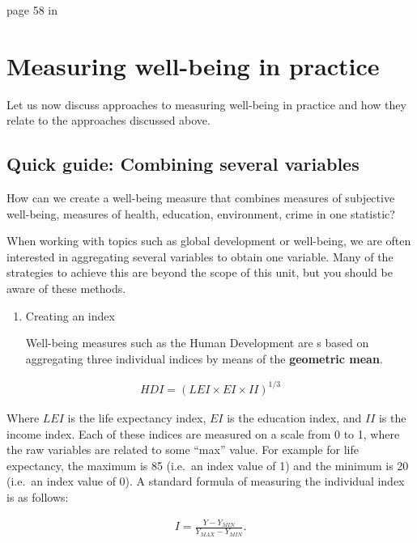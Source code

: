 \documentclass[]{book}
\begin{document}
page 58 in \citep{stiglitz2010report}

\hypertarget{measuring-well-being-in-practice}{%
\section{Measuring well-being in practice}\label{measuring-well-being-in-practice}}

Let us now discuss approaches to measuring well-being in practice and how they relate to the approaches discussed above.

\hypertarget{quick-guide-combining-several-variables}{%
\subsection{Quick guide: Combining several variables}\label{quick-guide-combining-several-variables}}

How can we create a well-being measure that combines measures of subjective well-being, measures of health, education, environment, crime in one statistic?

When working with topics such as global development or well-being, we are often interested in aggregating several variables to obtain one variable. Many of the strategies to achieve this are beyond the scope of this unit, but you should be aware of these methods.

\begin{enumerate}
\def\labelenumi{\arabic{enumi}.}
\item
  Creating an index

  Well-being measures such as the Human Development are s based on aggregating three individual indices by means of the \textbf{geometric mean}.
\end{enumerate}

\begin{align}
   HDI=(LEI\times EI\times II)^{1/3}
\end{align}

Where \(LEI\) is the life expectancy index, \(EI\) is the education index, and \(II\) is the income index. Each of these indices are measured on a scale from 0 to 1, where the raw variables are related to some ``max'' value. For example for life expectancy, the maximum is 85 (i.e.~an index value of 1) and the minimum is 20 (i.e.~an index value of 0). A standard formula of measuring the individual index is as follows:

\begin{align}
   I=\frac{Y-Y_{MIN}}{Y_{MAX}-Y_{MIN}}.
\end{align}
\end{document}
